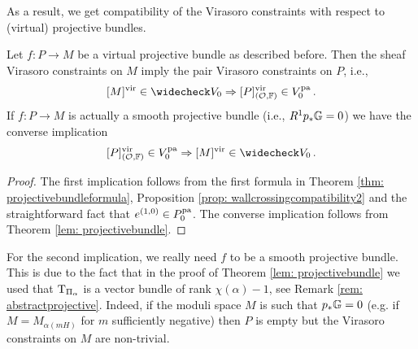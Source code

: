 \documentclass[a4paper, 12pt]{amsart}
\begin{document}
As a result, we get compatibility of the Virasoro constraints with respect to (virtual) projective bundles.

\begin{corollary}\label{cor: MimpliesP}
Let $f\colon P\to M$ be a virtual projective bundle as described before. Then the sheaf Virasoro constraints on $M$ imply the pair Virasoro constraints on $P$, i.e.,
\[[M]^\vir\in \widecheck V_0\Rightarrow [P]^\vir_{(\CO,\BF)}\in  V_0^{\pa}\,.\]
If $f\colon P\to M$ is actually a smooth projective bundle (i.e., $R^1p_\ast {\mathbb{G}}=0$) we have the converse implication
\[ [P]^\vir_{(\CO,\BF)}\in  V_0^{\pa} \Rightarrow[M]^\vir\in \widecheck V_0\,.\]
\end{corollary}
\begin{proof}
The first implication follows from the first formula in Theorem \ref{thm: projectivebundleformula}, Proposition \ref{prop: wallcrossingcompatibility2} and the straightforward fact that $e^{(1,0)}\in P_0^{\mathop{\rm pa}\nolimits}$. The converse implication follows from Theorem \ref{lem: projectivebundle}.\qedhere
\end{proof}

\begin{remark}
For the second implication, we really need $f$ to be a smooth projective bundle. This is due to the fact that in the proof of Theorem \ref{lem: projectivebundle} we used that $\mathrm{T}_{\Pi_\alpha}$ is a vector bundle of rank $\chi(\alpha)-1$, see Remark \ref{rem: abstractprojective}. Indeed, if the moduli space $M$ is such that $p_\ast {\mathbb{G}}=0$ (e.g. if $M=M_{\alpha(mH)}$ for $m$ sufficiently negative) then $P$ is empty but the Virasoro constraints on $M$ are non-trivial.
\end{remark}
\end{document}
